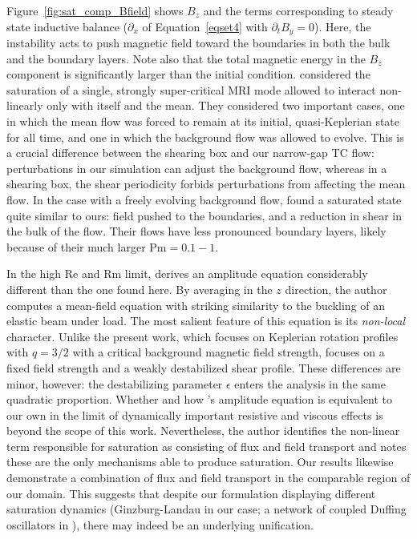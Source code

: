 \documentclass{emulateapj}
\newcommand\reye{\mathrm{Re}}
\newcommand\reym{\mathrm{Rm}}
\newcommand{\Pm}{\mathrm{Pm}}
\begin{document}
Figure~\ref{fig:sat_comp_Bfield} shows $B_z$ and the terms corresponding to steady state inductive balance ($\partial_x$ of Equation~\ref{eqset4} with $\partial_t B_{y} = 0$). Here, the instability acts to push magnetic field toward the boundaries in both the bulk and the boundary layers. Note also that the total magnetic energy in the $B_z$ component is significantly larger than the initial condition. \citet{Ebrahimi:2009ey} considered the saturation of a single, strongly super-critical MRI mode allowed to interact non-linearly only with itself and the mean. They considered two important cases, one in which the mean flow was forced to remain at its initial, quasi-Keplerian state for all time, and one in which the background flow was allowed to evolve. This is a crucial difference between the shearing box and our narrow-gap TC flow: perturbations in our simulation can adjust the background flow, whereas in a shearing box, the shear periodicity forbids perturbations from affecting the mean flow. In the case with a freely evolving background flow, \citet{Ebrahimi:2009ey} found a saturated state quite similar to ours: field pushed to the boundaries, and a reduction in shear in the bulk of the flow. Their flows have less pronounced boundary layers, likely because of their much larger $\Pm = 0.1 -1$. 

In the high $\reye$ and  $\reym$  limit, \citet{Vasil:2015} derives an amplitude equation considerably different than the one found here. By averaging in the $z$ direction, the author computes a mean-field equation with striking similarity to the buckling of an elastic beam under load. The most salient feature of this equation is its \emph{non-local} character. Unlike the present work, which focuses on Keplerian rotation profiles with $q = 3/2$ with a critical background magnetic field strength, \citet{Vasil:2015} focuses on a fixed field strength and a weakly destabilized shear profile. These differences are minor, however: the destabilizing parameter $\epsilon$ enters the analysis in the same quadratic proportion. Whether and how \citet{Vasil:2015}'s amplitude equation is equivalent to our own in the limit of dynamically important resistive and viscous effects is beyond the scope of this work. Nevertheless, the author identifies the non-linear term responsible for saturation as consisting of flux and field transport and notes these are the only mechanisms able to produce saturation. Our results likewise demonstrate a combination of flux and field transport in the comparable region of our domain. This suggests that despite our formulation displaying different saturation dynamics (Ginzburg-Landau in our case; a network of coupled Duffing oscillators in \citeauthor{Vasil:2015} \citeyear{Vasil:2015}), there may indeed be an underlying unification. 
\end{document}
